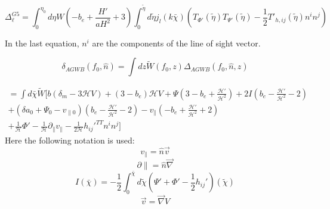 \begin{equation}
    \Delta_\ell^{G5}=\int_0^{\eta_0} d\eta W \left(-b_e + \frac{H'}{aH^2} +3\right) \int_0^{\tilde{\eta}} d\tilde{\eta} j_l(k \bar{\chi}) \left( T_{\Phi'}(\tilde{\eta})T_{\Psi'}(\tilde{\eta})-\frac{1}{2}T'_{h, ij}(\tilde{\eta})n^i n^j \right)
\end{equation}

In the last equation, $n^i$ are the components of the line of sight vector.

\begin{equation}
    \label{window_fct_def}
        \delta_{AGWB}(f_0, \hat{n})=\int dz \tilde{W}(f_0, z)\Delta_{AGWB}(f_0, \hat{n}, z)
    \end{equation}

\begin{equation}
    \begin{split}
        = \int d\bar{\chi} \tilde{W} [b(\delta_m - 3\mathcal{H}V)+(3-b_e)\mathcal{H}V+
        \Psi(3-b_e+\frac{\mathcal{H'}}{\mathcal{H}^2})+2I(b_e
        -\frac{\mathcal{H'}}{\mathcal{H}^2}-2) \\
        +(\delta a_0+\Psi_0 - v_{\parallel 0})(b_e
        -\frac{\mathcal{H'}}{\mathcal{H}^2}-2)-v_\parallel (-b_e
        +\frac{\mathcal{H'}}{\mathcal{H}^2}+2) \\
        +\frac{1}{\mathcal{H}}\Phi' 
        -\frac{1}{\mathcal{H}}\partial_\parallel v_\parallel 
        - \frac{1}{2\mathcal{H}}h_{ij}'^{TT} n^i n^j]
    \end{split}
    \end{equation}
    Here the following notation is used:
    \begin{equation}
            v_\parallel = \hat{n} \vec{v} 
    \end{equation}
    \begin{equation}
            \partial{\parallel} = \hat{n} \vec{\nabla} 
    \end{equation}
    \begin{equation}
            I(\bar{\chi}) = -\frac{1}{2} \int_0^{\bar{\chi}} d\tilde{\chi} 
            (\Psi' + \Phi ' -\frac{1}{2}h_{ij}')(\tilde{\chi} )
    \end{equation}
    \begin{equation}
            \vec{v} = \vec{\nabla} V 
    \end{equation}


